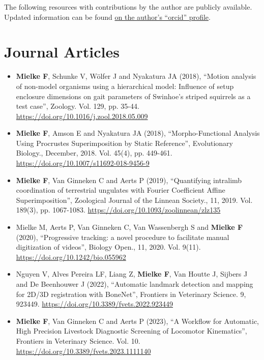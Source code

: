 \begin{change}
The following resources with contributions by the author are publicly available.
Updated information can be found \href{https://orcid.org/0000-0003-3229-0981}{on the author's ``orcid'' profile}.

\section{Journal Articles}
\label{sec:org7a00a54}

\begin{itemize}
\item \textbf{Mielke F}, Schunke V, Wölfer J and Nyakatura JA (2018), ``Motion analysis of non-model organisms using a hierarchical model: Influence of setup enclosure dimensions on gait parameters of Swinhoe’s striped squirrels as a test case'', Zoology. Vol. 129, pp. 35-44. \url{https://doi.org/10.1016/j.zool.2018.05.009}

\item \textbf{Mielke F}, Amson E and Nyakatura JA (2018), ``Morpho-Functional Analysis Using Procrustes Superimposition by Static Reference'', Evolutionary Biology., December, 2018. Vol. 45(4), pp. 449-461. \url{https://doi.org/10.1007/s11692-018-9456-9}

\item \textbf{Mielke F}, Van Ginneken C and Aerts P (2019), ``Quantifying intralimb coordination of terrestrial ungulates with Fourier Coefficient Affine Superimposition'', Zoological Journal of the Linnean Society., 11, 2019. Vol. 189(3), pp. 1067-1083. \url{https://doi.org/10.1093/zoolinnean/zlz135}

\item Mielke M, Aerts P, Van Ginneken C, Van Wassenbergh S and \textbf{Mielke F} (2020), ``Progressive tracking: a novel procedure to facilitate manual digitization of videos'', Biology Open., 11, 2020. Vol. 9(11). \url{https://doi.org/10.1242/bio.055962}

\item Nguyen V, Alves Pereira LF, Liang Z, \textbf{Mielke F}, Van Houtte J, Sijbers J and De Beenhouwer J (2022), ``Automatic landmark detection and mapping for 2D/3D registration with BoneNet'', Frontiers in Veterinary Science. 9, 923449. \url{https://doi.org/10.3389/fvets.2022.923449}

\item \textbf{Mielke F}, Van Ginneken C and Aerts P (2023), ``A Workflow for Automatic, High Precision Livestock Diagnostic Screening of Locomotor Kinematics'', Frontiers in Veterinary Science. Vol. 10. \url{https://doi.org/10.3389/fvets.2023.1111140}


\end{itemize}
\end{change}
